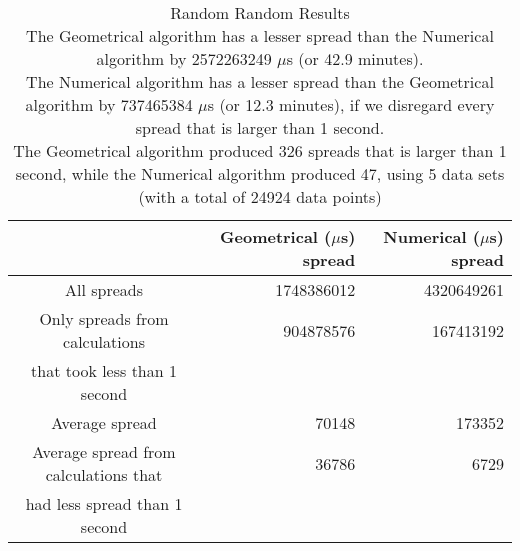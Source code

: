 \begin{table}[bth!]\footnotesize
 \begin{tabular}[3]{c|r|r}
 & Geometrical ($\mu$s) spread & Numerical ($\mu$s) spread\\
\hline
All spreads & 1748386012 & 4320649261 \\ 
\hline 
Only spreads from calculations & 904878576 & 167413192 \\ 
that took less than 1 second & & \\ 
\hline
Average spread & 70148 & 173352 \\
\hline
Average spread from calculations that & 36786 & 6729 \\ 
had less spread than 1 second & & \\ 
\end{tabular}\\ \\
\caption{Random Random Results\\
The Geometrical algorithm has a lesser spread than the Numerical algorithm by 2572263249 $\mu$s (or 42.9 minutes).\\
The Numerical algorithm has a lesser spread than the Geometrical algorithm by 737465384 $\mu$s (or 12.3 minutes), if we disregard every spread that is larger than 1 second.\\
The Geometrical algorithm produced 326 spreads that is larger than 1 second, while the Numerical algorithm produced 47, using 5 data sets (with a total of 24924 data points)\\
}\label{random-random_spreadtable}\end{table}